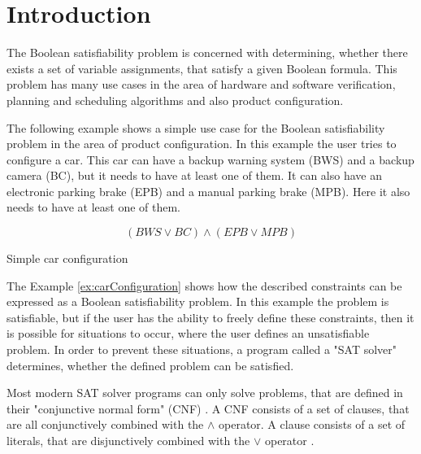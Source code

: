 
\chapter{Introduction}
\label{ch:Introduction}

The Boolean satisfiability problem is concerned with determining, whether there exists a set of variable assignments, that satisfy a given Boolean formula. This problem has many use cases in the area of hardware and software verification, planning and scheduling algorithms \cite{biere2009handbook} and also product configuration.

The following example shows a simple use case for the Boolean satisfiability problem in the area of product configuration. In this example the user tries to configure a car. This car can have a backup warning system (BWS) and a backup camera (BC), but it needs to have at least one of them. It can also have an electronic parking brake (EPB) and a manual parking brake (MPB). Here it also needs to have at least one of them.
\begin{example}
\begin{leftbar}
\begin{displaymath}
(BWS \vee BC) \wedge (EPB \vee MPB)
\end{displaymath}
\end{leftbar}
\caption{Simple car configuration}
\label{ex:carConfiguration}
\end{example}

The Example \ref{ex:carConfiguration} shows how the described constraints can be expressed as a Boolean satisfiability problem. In this example the problem is satisfiable, but if the user has the ability to freely define these constraints, then it is possible for situations to occur, where the user defines an unsatisfiable problem. In order to prevent these situations, a program called a "SAT solver" determines, whether the defined problem can be satisfied.

Most modern SAT solver programs can only solve problems, that are defined in their "conjunctive normal form" (CNF) \cite{biere2009handbook}. A CNF consists of a set of clauses, that are all conjunctively combined with the $\wedge$ operator. A clause consists of a set of literals, that are disjunctively combined with the $\vee$ operator \cite{biere2009handbook}.

